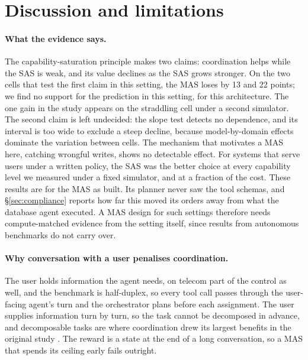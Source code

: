 \section{Discussion and limitations}
\label{sec:discussion}

\paragraph{What the evidence says.} The capability-saturation principle makes two claims: coordination helps while the SAS is weak, and its value declines as the SAS grows stronger. On the two cells that test the first claim in this setting, the MAS loses by 13 and 22 points; we find no support for the prediction in this setting, for this architecture. The one gain in the study appears on the straddling cell under a second simulator. The second claim is left undecided: the slope test detects no dependence, and its interval is too wide to exclude a steep decline, because model-by-domain effects dominate the variation between cells. The mechanism that motivates a MAS here, catching wrongful writes, shows no detectable effect. For systems that serve users under a written policy, the SAS was the better choice at every capability level we measured under a fixed simulator, and at a fraction of the cost. These results are for the MAS as built. Its planner never saw the tool schemas, and \S\ref{sec:compliance} reports how far this moved its orders away from what the database agent executed. A MAS design for such settings therefore needs compute-matched evidence from the setting itself, since results from autonomous benchmarks do not carry over.

\paragraph{Why conversation with a user penalises coordination.} The user holds information the agent needs, on telecom part of the control as well, and the benchmark is half-duplex, so every tool call passes through the user-facing agent's turn and the orchestrator plans before each assignment. The user supplies information turn by turn, so the task cannot be decomposed in advance, and decomposable tasks are where coordination drew its largest benefits in the original study \citep{kim2026capable}. The reward is a state at the end of a long conversation, so a MAS that spends its ceiling early fails outright.

